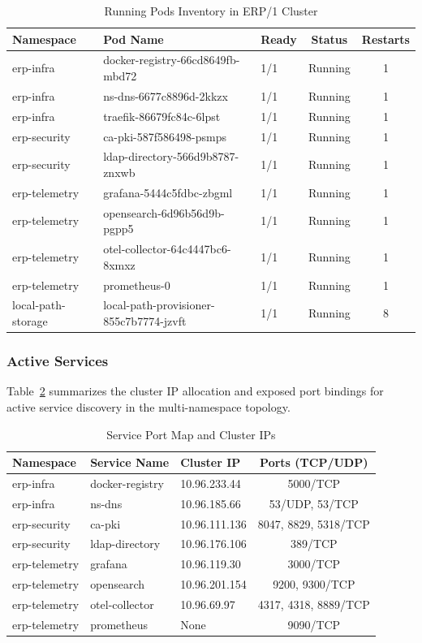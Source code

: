 \documentclass{article}
\begin{document}
\begin{table}[H]
\centering
\caption{Running Pods Inventory in ERP/1 Cluster}
\label{tab:pods}
\small
\begin{tabular}{lllcc}
\toprule
\textbf{Namespace} & \textbf{Pod Name} & \textbf{Ready} & \textbf{Status} & \textbf{Restarts} \\
\midrule
erp-infra & docker-registry-66cd8649fb-mbd72 & 1/1 & Running & 1 \\
erp-infra & ns-dns-6677c8896d-2kkzx & 1/1 & Running & 1 \\
erp-infra & traefik-86679fc84c-6lpst & 1/1 & Running & 1 \\
erp-security & ca-pki-587f586498-psmps & 1/1 & Running & 1 \\
erp-security & ldap-directory-566d9b8787-znxwb & 1/1 & Running & 1 \\
erp-telemetry & grafana-5444c5fdbc-zbgml & 1/1 & Running & 1 \\
erp-telemetry & opensearch-6d96b56d9b-pgpp5 & 1/1 & Running & 1 \\
erp-telemetry & otel-collector-64c4447bc6-8xmxz & 1/1 & Running & 1 \\
erp-telemetry & prometheus-0 & 1/1 & Running & 1 \\
local-path-storage & local-path-provisioner-855c7b7774-jzvft & 1/1 & Running & 8 \\
\bottomrule
\end{tabular}
\end{table}

\subsubsection{Active Services}
Table~\ref{tab:services} summarizes the cluster IP allocation and exposed port
bindings for active service discovery in the multi-namespace topology.

\begin{table}[H]
\centering
\caption{Service Port Map and Cluster IPs}
\label{tab:services}
\small
\begin{tabular}{lllc}
\toprule
\textbf{Namespace} & \textbf{Service Name} & \textbf{Cluster IP} & \textbf{Ports (TCP/UDP)} \\
\midrule
erp-infra & docker-registry & 10.96.233.44 & 5000/TCP \\
erp-infra & ns-dns & 10.96.185.66 & 53/UDP, 53/TCP \\
erp-security & ca-pki & 10.96.111.136 & 8047, 8829, 5318/TCP \\
erp-security & ldap-directory & 10.96.176.106 & 389/TCP \\
erp-telemetry & grafana & 10.96.119.30 & 3000/TCP \\
erp-telemetry & opensearch & 10.96.201.154 & 9200, 9300/TCP \\
erp-telemetry & otel-collector & 10.96.69.97 & 4317, 4318, 8889/TCP \\
erp-telemetry & prometheus & None & 9090/TCP \\
\bottomrule
\end{tabular}
\end{table}
\end{document}
